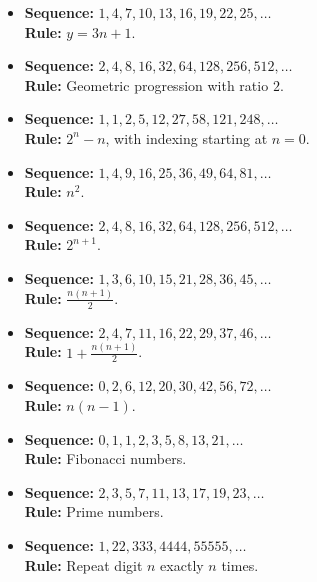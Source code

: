 \documentclass{article}
\theoremstyle{plain}
\theoremstyle{definition}
\theoremstyle{remark}
\begin{document}
\begin{itemize}
    \item \textbf{Sequence:} \(1, 4, 7, 10, 13, 16, 19, 22, 25, \dots\) \\
    \textbf{Rule:} \(y = 3n + 1\).

    \item \textbf{Sequence:} \(2, 4, 8, 16, 32, 64, 128, 256, 512, \dots\) \\
    \textbf{Rule:} Geometric progression with ratio \(2\).

    \item \textbf{Sequence:} \(1, 1, 2, 5, 12, 27, 58, 121, 248, \dots\) \\
    \textbf{Rule:} \(2^n - n\), with indexing starting at \(n=0\).

    \item \textbf{Sequence:} \(1, 4, 9, 16, 25, 36, 49, 64, 81, \dots\) \\
    \textbf{Rule:} \(n^2\).

    \item \textbf{Sequence:} \(2, 4, 8, 16, 32, 64, 128, 256, 512, \dots\) \\
    \textbf{Rule:} \(2^{n+1}\).

    \item \textbf{Sequence:} \(1, 3, 6, 10, 15, 21, 28, 36, 45, \dots\) \\
    \textbf{Rule:} \(\frac{n(n+1)}{2}\).

    \item \textbf{Sequence:} \(2, 4, 7, 11, 16, 22, 29, 37, 46, \dots\) \\
    \textbf{Rule:} \(1 + \frac{n(n+1)}{2}\).

    \item \textbf{Sequence:} \(0, 2, 6, 12, 20, 30, 42, 56, 72, \dots\) \\
    \textbf{Rule:} \(n(n-1)\).

    \item \textbf{Sequence:} \(0, 1, 1, 2, 3, 5, 8, 13, 21, \dots\) \\
    \textbf{Rule:} Fibonacci numbers.

    \item \textbf{Sequence:} \(2, 3, 5, 7, 11, 13, 17, 19, 23, \dots\) \\
    \textbf{Rule:} Prime numbers.

    \item \textbf{Sequence:} \(1, 22, 333, 4444, 55555, \dots\) \\
    \textbf{Rule:} Repeat digit \(n\) exactly \(n\) times.


\end{itemize}
\end{document}
